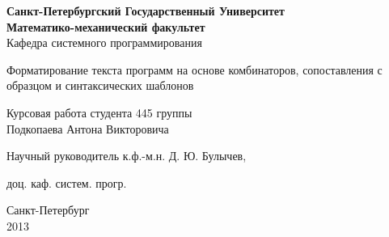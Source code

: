 \begin{titlepage}
\newpage

\begin{center}
	\textbf{
		Санкт-Петербургский Государственный Университет \\
		Математико-механический факультет \\
	}
	Кафедра системного программирования
\end{center}

\vspace{15em}

\begin{center}
\Large Форматирование текста программ на основе комбинаторов, сопоставления с образцом и синтаксических шаблонов \\ 
\end{center}

\vspace{2em}

\begin{center}
Курсовая работа студента 445 группы \\
Подкопаева Антона Викторовича

\end{center}

\vspace{10em}

Научный руководитель\dotfill
к.ф.-м.н. Д. Ю. Булычев,\\ {\raggedright доц. каф. систем. прогр.}



\vspace{\fill}

\begin{center}
Санкт-Петербург \\2013
\end{center}

\end{titlepage}